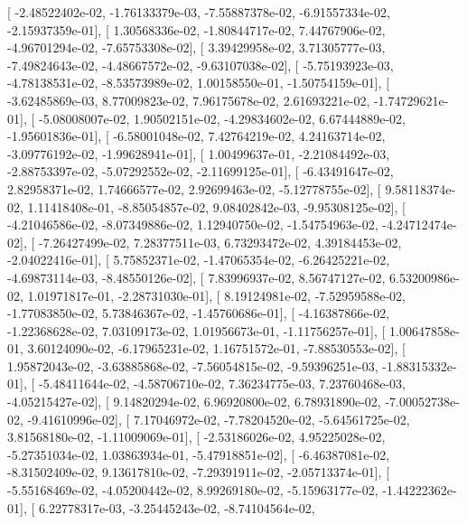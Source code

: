 \documentclass{article}
\begin{document}
       [ -2.48522402e-02,  -1.76133379e-03,  -7.55887378e-02,
         -6.91557334e-02,  -2.15937359e-01],
       [  1.30568336e-02,  -1.80844717e-02,   7.44767906e-02,
         -4.96701294e-02,  -7.65753308e-02],
       [  3.39429958e-02,   3.71305777e-03,  -7.49824643e-02,
         -4.48667572e-02,  -9.63107038e-02],
       [ -5.75193923e-03,  -4.78138531e-02,  -8.53573989e-02,
          1.00158550e-01,  -1.50754159e-01],
       [ -3.62485869e-03,   8.77009823e-02,   7.96175678e-02,
          2.61693221e-02,  -1.74729621e-01],
       [ -5.08008007e-02,   1.90502151e-02,  -4.29834602e-02,
          6.67444889e-02,  -1.95601836e-01],
       [ -6.58001048e-02,   7.42764219e-02,   4.24163714e-02,
         -3.09776192e-02,  -1.99628941e-01],
       [  1.00499637e-01,  -2.21084492e-03,  -2.88753397e-02,
         -5.07292552e-02,  -2.11699125e-01],
       [ -6.43491647e-02,   2.82958371e-02,   1.74666577e-02,
          2.92699463e-02,  -5.12778755e-02],
       [  9.58118374e-02,   1.11418408e-01,  -8.85054857e-02,
          9.08402842e-03,  -9.95308125e-02],
       [ -4.21046586e-02,  -8.07349886e-02,   1.12940750e-02,
         -1.54754963e-02,  -4.24712474e-02],
       [ -7.26427499e-02,   7.28377511e-03,   6.73293472e-02,
          4.39184453e-02,  -2.04022416e-01],
       [  5.75852371e-02,  -1.47065354e-02,  -6.26425221e-02,
         -4.69873114e-03,  -8.48550126e-02],
       [  7.83996937e-02,   8.56747127e-02,   6.53200986e-02,
          1.01971817e-01,  -2.28731030e-01],
       [  8.19124981e-02,  -7.52959588e-02,  -1.77083850e-02,
          5.73846367e-02,  -1.45760686e-01],
       [ -4.16387866e-02,  -1.22368628e-02,   7.03109173e-02,
          1.01956673e-01,  -1.11756257e-01],
       [  1.00647858e-01,   3.60124090e-02,  -6.17965231e-02,
          1.16751572e-01,  -7.88530553e-02],
       [  1.95872043e-02,  -3.63885868e-02,  -7.56054815e-02,
         -9.59396251e-03,  -1.88315332e-01],
       [ -5.48411644e-02,  -4.58706710e-02,   7.36234775e-03,
          7.23760468e-03,  -4.05215427e-02],
       [  9.14820294e-02,   6.96920800e-02,   6.78931890e-02,
         -7.00052738e-02,  -9.41610996e-02],
       [  7.17046972e-02,  -7.78204520e-02,  -5.64561725e-02,
          3.81568180e-02,  -1.11009069e-01],
       [ -2.53186026e-02,   4.95225028e-02,  -5.27351034e-02,
          1.03863934e-01,  -5.47918851e-02],
       [ -6.46387081e-02,  -8.31502409e-02,   9.13617810e-02,
         -7.29391911e-02,  -2.05713374e-01],
       [ -5.55168469e-02,  -4.05200442e-02,   8.99269180e-02,
         -5.15963177e-02,  -1.44222362e-01],
       [  6.22778317e-03,  -3.25445243e-02,  -8.74104564e-02,
\end{document}
